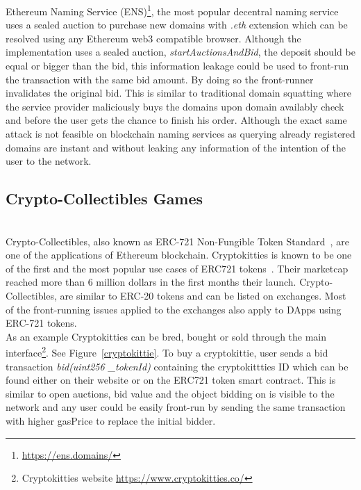 Ethereum Naming Service (ENS)\footnote{\url{https://ens.domains/}}, the most popular decentral naming service uses a sealed auction to purchase new domains with \textit{.eth} extension which can be resolved using any Ethereum web3 compatible browser. Although the implementation uses a sealed auction, \textit{startAuctionsAndBid}, the deposit should be equal or bigger than the bid, this information leakage could be used to front-run the transaction with the same bid amount. By doing so the front-runner invalidates the original bid. This is similar to traditional domain squatting where the service provider maliciously buys the domains upon domain availably check and before the user gets the chance to finish his order. Although the exact same attack is not feasible on blockchain naming services as querying already registered domains are instant and without leaking any information of the intention of the user to the network.



\subsection{Crypto-Collectibles Games} \hfill\\ 

Crypto-Collectibles, also known as ERC-721 Non-Fungible Token Standard~\cite{erc721}, are one of the applications of Ethereum blockchain. Cryptokitties is known to be one of the first and the most popular use cases of ERC721 tokens~\cite{cryptokitties}. Their marketcap reached more than 6 million dollars in the first months their launch. Crypto-Collectibles, are similar to ERC-20 tokens and can be listed on exchanges. Most of the front-running issues applied to the exchanges also apply to DApps using ERC-721 tokens. \\

As an example Cryptokitties can be bred, bought or sold through the main interface\footnote{Cryptokitties website \url{https://www.cryptokitties.co/}}. See Figure~\ref{cryptokittie}.
To buy a cryptokittie, user sends a bid transaction \textit{bid(uint256 \_tokenId)} containing the cryptokittties ID which can be found either on their website or on the ERC721 token smart contract. This is similar to open auctions, bid value and the object bidding on is visible to the network and any user could be easily front-run by sending the same transaction with higher gasPrice to replace the initial bidder. 


